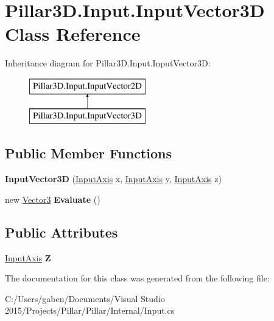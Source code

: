 \hypertarget{class_pillar3_d_1_1_input_1_1_input_vector3_d}{}\section{Pillar3\+D.\+Input.\+Input\+Vector3D Class Reference}
\label{class_pillar3_d_1_1_input_1_1_input_vector3_d}
Inheritance diagram for Pillar3\+D.\+Input.\+Input\+Vector3D\+:\begin{figure}[H]
\begin{center}
\leavevmode
\includegraphics[height=2.000000cm]{class_pillar3_d_1_1_input_1_1_input_vector3_d}
\end{center}
\end{figure}
\subsection*{Public Member Functions}
\begin{DoxyCompactItemize}
\item 
\mbox{\label{class_pillar3_d_1_1_input_1_1_input_vector3_d_a72d21323b3e420bd9fdec5b8163827e8}} 
{\bfseries Input\+Vector3D} (\hyperlink{class_pillar3_d_1_1_input_1_1_input_axis}{Input\+Axis} x, \hyperlink{class_pillar3_d_1_1_input_1_1_input_axis}{Input\+Axis} y, \hyperlink{class_pillar3_d_1_1_input_1_1_input_axis}{Input\+Axis} z)
\item 
\mbox{\label{class_pillar3_d_1_1_input_1_1_input_vector3_d_af4551b218288c9d9cfef295c9668530b}} 
new \hyperlink{class_pillar3_d_1_1_vector3}{Vector3} {\bfseries Evaluate} ()
\end{DoxyCompactItemize}
\subsection*{Public Attributes}
\begin{DoxyCompactItemize}
\item 
\mbox{\label{class_pillar3_d_1_1_input_1_1_input_vector3_d_a35e4249c283e28d783252b7cc571cba4}} 
\hyperlink{class_pillar3_d_1_1_input_1_1_input_axis}{Input\+Axis} {\bfseries Z}
\end{DoxyCompactItemize}


The documentation for this class was generated from the following file\+:\begin{DoxyCompactItemize}
\item 
C\+:/\+Users/gaben/\+Documents/\+Visual Studio 2015/\+Projects/\+Pillar/\+Pillar/\+Internal/Input.\+cs\end{DoxyCompactItemize}
